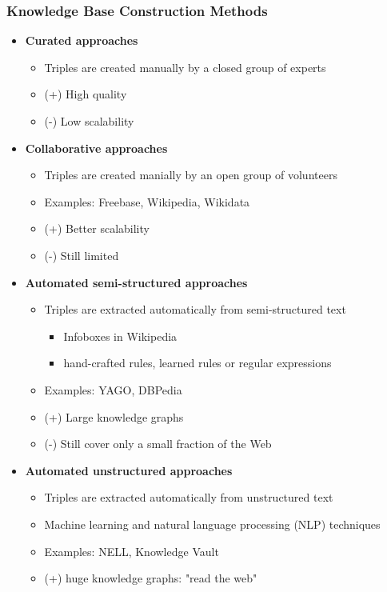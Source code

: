 	\subsubsection{Knowledge Base Construction Methods}
		\begin{itemize}
			\item \textbf{Curated approaches}
				\begin{itemize}
					\item Triples are created manually by a closed group of experts
					\item (+) High quality
					\item (-) Low scalability
				\end{itemize}
			\item \textbf{Collaborative approaches}
				\begin{itemize}
					\item Triples are created manially by an open group of volunteers
					\item Examples: Freebase, Wikipedia, Wikidata
					\item (+) Better scalability
					\item (-) Still limited
				\end{itemize}
			\item \textbf{Automated semi-structured approaches}
				\begin{itemize}
					\item Triples are extracted automatically from semi-structured text
						\begin{itemize}
							\item Infoboxes in Wikipedia
							\item hand-crafted rules, learned rules or regular expressions
						\end{itemize}
					\item Examples: YAGO, DBPedia
					\item (+) Large knowledge graphs
					\item (-) Still cover only a small fraction of the Web
				\end{itemize}
			\item \textbf{Automated unstructured approaches}
				\begin{itemize}
					\item Triples are extracted automatically from unstructured text
					\item Machine learning and natural language processing (NLP) techniques
					\item Examples: NELL, Knowledge Vault
					\item (+) huge knowledge graphs: "read the web"
				\end{itemize}
		\end{itemize}

